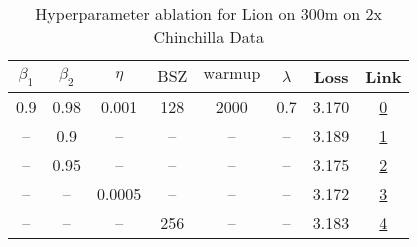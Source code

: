 \begin{table}[H]
\centering
\caption{Hyperparameter ablation for Lion on 300m on 2x Chinchilla Data}
\label{tab:ablation_lion_300m_2}
\begin{tabular}{cccccccc}
\toprule
$\beta_1$ & $\beta_2$ & $\eta$ & $\mathrm{BSZ}$ & $\mathrm{warmup}$ & $\lambda$ & Loss & Link \\
\midrule
0.9 & 0.98 & 0.001 & 128 & 2000 & 0.7 & 3.170 & \href{https://wandb.ai/stanford-mercury/optimizer-scaling/runs/sweep-300m-12B-lion5aad2alr0.001-wd0.7-minlr0-warmup2000-b10.9-b-b039e3}{0} \\
\midrule
-- & 0.9 & -- & -- & -- & -- & 3.189 & \href{https://wandb.ai/stanford-mercury/optimizer-scaling/runs/sweep-300m-12B-lionb554b6lr0.001-wd0.7-minlr0-warmup2000-b10.9-b-44d68f}{1} \\
-- & 0.95 & -- & -- & -- & -- & 3.175 & \href{https://wandb.ai/stanford-mercury/optimizer-scaling/runs/sweep-300m-12B-lion1d519dlr0.001-wd0.7-minlr0-warmup2000-b10.9-b-2aa8be}{2} \\
-- & -- & 0.0005 & -- & -- & -- & 3.172 & \href{https://wandb.ai/stanford-mercury/optimizer-scaling/runs/sweep-300m-12B-liond0e427lr0.0005-wd0.7-minlr0-warmup2000-b10.9--07e662}{3} \\
-- & -- & -- & 256 & -- & -- & 3.183 & \href{https://wandb.ai/stanford-mercury/optimizer-scaling/runs/sweep-300m-12B-lion804c87lr0.001-wd0.7-minlr0-warmup2000-b10.9-b-d99925}{4} \\
\bottomrule
\end{tabular}
\end{table}

